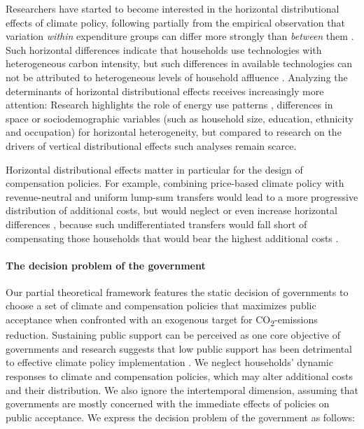 \documentclass[12pt, a4paper]{article}
\begin{document}
Researchers have started to become interested in the horizontal distributional effects of climate policy, following partially from the empirical observation that variation \textit{within} expenditure groups can differ more strongly than \textit{between} them \autocite{Cronin.2019,Steckel.2021b,Pizer.2019}. Such horizontal differences indicate that households use technologies with heterogeneous carbon intensity, but such differences in available technologies can not be attributed to heterogeneous levels of household affluence \autocite{Hansel.2022}. Analyzing the determinants of horizontal distributional effects receives increasingly more attention: Research highlights the role of energy use patterns \autocite{Steckel.2021b,Missbach.2024}, differences in space \autocite{Chan.2023,Burtraw.2009} or sociodemographic variables (such as household size, education, ethnicity and occupation) \autocite{Grainger.2010,Buchs.2013,Farrell.2017,Missbach.2023,Fremstad.2019} for horizontal heterogeneity, but compared to research on the drivers of vertical distributional effects such analyses remain scarce.

Horizontal distributional effects matter in particular for the design of compensation policies. For example, combining price-based climate policy with revenue-neutral and uniform lump-sum transfers would lead to a more progressive distribution of additional costs, but would neglect or even increase horizontal differences \autocite{Cronin.2019,Hansel.2022}, because such undifferentiated transfers would fall short of compensating those households that would bear the highest additional costs \autocite{Fullerton.2019,Missbach.2024,Sallee.2019}.

\paragraph{The decision problem of the government}
Our partial theoretical framework features the static decision of governments to choose a set of climate and compensation policies that maximizes public acceptance when confronted with an exogenous target for CO\textsubscript{2}-emissions reduction. Sustaining public support can be perceived as one core objective of governments and research suggests that low public support has been detrimental to effective climate policy implementation \autocite{Carattini.2018,Bergquist.2022,Douenne.2022}. We neglect households' dynamic responses to climate and compensation policies, which may alter additional costs and their distribution. We also ignore the intertemporal dimension, assuming that governments are mostly concerned with the immediate effects of policies on public acceptance. We express the decision problem of the government as follows:  
\end{document}
